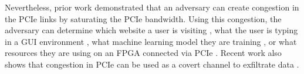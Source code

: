 Nevertheless, prior work demonstrated that an adversary can create congestion in the PCIe links by saturating the PCIe bandwidth.
Using this congestion, the adversary can determine which website a user is visiting \cite{tan2021invisible, side2022lockeddown}, what the user is typing in a GUI environment \cite{tan2021invisible}, what machine learning model they are training \cite{tan2021invisible}, or what resources they are using on an FPGA connected via PCIe \cite{giechaskiel2022cross}.
Recent work also shows that congestion in PCIe can be used as a covert channel to exfiltrate data \cite{giechaskiel2022cross, khaliq2021timing}.

\begin{comment}
https://www.linkedin.com/pulse/pci-express-primer-3-transaction-layer-simon-southwell/
\end{comment}